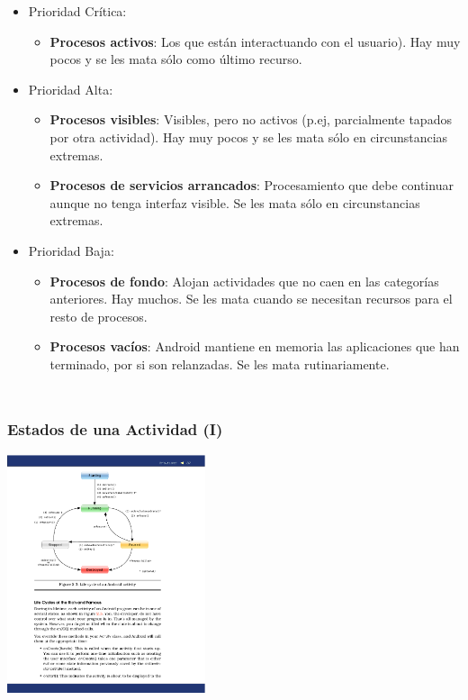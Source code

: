 \documentclass[hyperref={pdfpagelabels=true},ucs]{beamer}
\begin{document}
\begin{frame}[shrink=30]
\begin{columns}[c]
  \begin{itemize}
  \item \alert{Prioridad Crítica:}
    \begin{itemize}
      \item \textbf{Procesos activos}: Los que están interactuando con
        el usuario). Hay muy pocos y se les mata sólo como último
        recurso.
    \end{itemize}
  \item \alert{Prioridad Alta:}
    \begin{itemize}
      \item \textbf{Procesos visibles}: Visibles, pero no activos
        (p.ej, parcialmente tapados por otra actividad).  Hay muy
        pocos y se les mata sólo en circunstancias extremas.
      \item \textbf{Procesos de servicios arrancados}: Procesamiento
        que debe continuar aunque no tenga interfaz visible. Se les
        mata sólo en circunstancias extremas.
    \end{itemize}
  \item \alert{Prioridad Baja:}
    \begin{itemize}
      \item \textbf{Procesos de fondo}: Alojan actividades que no caen
        en las categorías anteriores. Hay muchos. Se les mata cuando
        se necesitan recursos para el resto de procesos.
      \item \textbf{Procesos vacíos}: Android mantiene en memoria las
        aplicaciones que han terminado, por si son relanzadas. Se les
        mata rutinariamente.
    \end{itemize}
  \end{itemize}
\end{columns}


\end{frame}



\begin{frame}
\frametitle{Estados de una Actividad (I)}

\begin{center}
\includegraphics[height=70mm]{figs/PBHA-p37.pdf}  
\end{center}

\end{frame}
\end{document}
